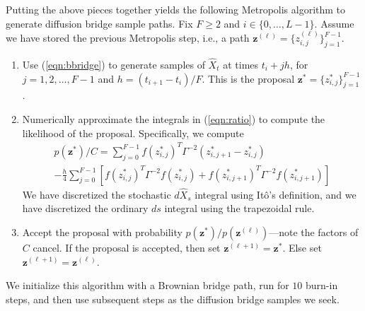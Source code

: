 \documentclass{article}
\newcommand{\bz}{\ensuremath{\mathbf{z}}}
\begin{document}
Putting the above pieces together yields the following Metropolis algorithm to generate diffusion bridge sample paths.  Fix $F \geq 2$ and $i \in \{0, \ldots, L-1\}$.  Assume we have stored the previous Metropolis step, i.e., a path $\bz^{(\ell)} = \{z_{i,j}^{(\ell)}\}_{j=1}^{F-1}$.
\begin{enumerate}
\item Use (\ref{eqn:bbridge}) to generate samples of $\widehat{X}_t$ at times $t_i + j h$, for $j = 1, 2, \ldots, F-1$ and $h = (t_{i+1} - t_i)/F$.  This is the proposal $\bz^\ast = \{z^\ast_{i,j}\}_{j=1}^{F-1}$.
\item Numerically approximate the integrals in (\ref{eqn:ratio}) to compute the likelihood of the proposal.  Specifically, we compute
\begin{multline*}
p(\bz^\ast)/C = \sum_{j=0}^{F-1} f(z^\ast_{i,j})^T \Gamma^{-2} (z^\ast_{i,j+1} - z^\ast_{i,j}) \\ - \frac{h}{4} \sum_{j=0}^{F-1} \left[ f(z^\ast_{i,j})^T \Gamma^{-2} f(z^\ast_{i,j}) + f(z^\ast_{i,j+1})^T \Gamma^{-2} f(z^\ast_{i,j+1}) \right]
\end{multline*}
We have discretized the stochastic $d\widehat{X}_s$ integral using It\^{o}'s definition, and we have discretized the ordinary $ds$ integral using the trapezoidal rule.
\item Accept the proposal with probability $p(\bz^\ast)/p(\bz^{(\ell)})$---note the factors of $C$ cancel.  If the proposal is accepted, then set $\bz^{(\ell+1)} = \bz^\ast$. Else set $\bz^{(\ell+1)} = \bz^{(\ell)}$.
\end{enumerate}
We initialize this algorithm with a Brownian bridge path, run for $10$ burn-in steps, and then use subsequent steps as the diffusion bridge samples we seek. 
\end{document}
